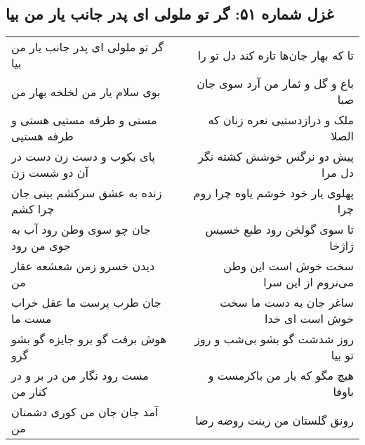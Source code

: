 \begin{center}
\section*{غزل شماره ۵۱: گر تو ملولی ای پدر جانب یار من بیا}
\label{sec:0051}
\begin{longtable}{l p{0.5cm} r}
گر تو ملولی ای پدر جانب یار من بیا
&&
تا که بهار جان‌ها تازه کند دل تو را
\\
بوی سلام یار من لخلخه بهار من
&&
باغ و گل و ثمار من آرد سوی جان صبا
\\
مستی و طرفه مستیی هستی و طرفه هستیی
&&
ملک و درازدستیی نعره زنان که الصلا
\\
پای بکوب و دست زن دست در آن دو شست زن
&&
پیش دو نرگس خوشش کشته نگر دل مرا
\\
زنده به عشق سرکشم بینی جان چرا کشم
&&
پهلوی یار خود خوشم یاوه چرا روم چرا
\\
جان چو سوی وطن رود آب به جوی من رود
&&
تا سوی گولخن رود طبع خسیس ژاژخا
\\
دیدن خسرو زمن شعشعه عقار من
&&
سخت خوش است این وطن می‌نروم از این سرا
\\
جان طرب پرست ما عقل خراب مست ما
&&
ساغر جان به دست ما سخت خوش است ای خدا
\\
هوش برفت گو برو جایزه گو بشو گرو
&&
روز شدشت گو بشو بی‌شب و روز تو بیا
\\
مست رود نگار من در بر و در کنار من
&&
هیچ مگو که یار من باکرمست و باوفا
\\
آمد جان جان من کوری دشمنان من
&&
رونق گلستان من زینت روضه رضا
\\
\end{longtable}
\end{center}
